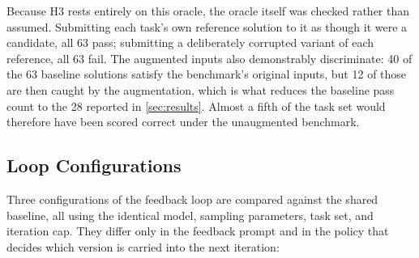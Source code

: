 Because H3 rests entirely on this oracle, the oracle itself was checked rather than
assumed. Submitting each task's own reference solution to it as though it were a
candidate, all 63 pass; submitting a deliberately corrupted variant of each
reference, all 63 fail. The augmented inputs also demonstrably discriminate: 40 of
the 63 baseline solutions satisfy the benchmark's original inputs, but 12 of those
are then caught by the augmentation, which is what reduces the baseline pass count
to the 28 reported in \cref{sec:results}. Almost a fifth of the task set would
therefore have been scored correct under the unaugmented benchmark.

\subsection{Loop Configurations}
\label{sec:configs}
Three configurations of the feedback loop are compared against the shared
baseline, all using the identical model, sampling parameters, task set, and
iteration cap. They differ only in the feedback prompt and in the policy that
decides which version is carried into the next iteration:
